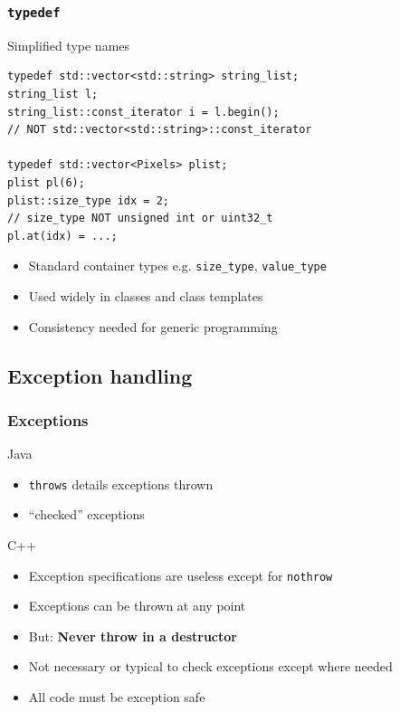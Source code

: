 \documentclass[handout]{beamer}
\begin{document}
\begin{frame}[fragile]
  \frametitle{\texttt{typedef}}
  \begin{block}{Simplified type names}
    \begin{lstlisting}
typedef std::vector<std::string> string_list;
string_list l;
string_list::const_iterator i = l.begin();
// NOT std::vector<std::string>::const_iterator

typedef std::vector<Pixels> plist;
plist pl(6);
plist::size_type idx = 2;
// size_type NOT unsigned int or uint32_t
pl.at(idx) = ...;
\end{lstlisting}
    \begin{itemize}
      \pause
    \item Standard container types e.g. \texttt{size\_type}, \texttt{value\_type}
      \pause
    \item Used widely in classes and class templates
    \item Consistency needed for generic programming
    \end{itemize}
  \end{block}
\end{frame}

\subsection{Exception handling}
\begin{frame}[fragile]
  \frametitle{Exceptions}
  \begin{block}{Java}
    \begin{itemize}
    \item \texttt{throws} details exceptions thrown
    \item “checked” exceptions
    \end{itemize}
  \end{block}
  \begin{block}{C++}
    \begin{itemize}
    \item Exception specifications are useless except for \texttt{nothrow}
      \pause
    \item Exceptions can be thrown at any point
      \pause
    \item But: \textbf{Never throw in a destructor}
      \pause
    \item Not necessary or typical to check exceptions except where needed
      \pause
    \item All code must be exception safe
    \end{itemize}
  \end{block}
\end{frame}
\end{document}
